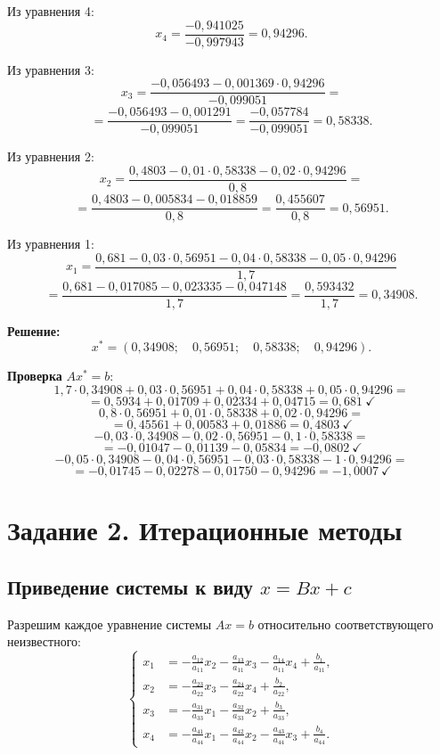\documentclass[a4paper, final]{article}
\begin{document}
Из уравнения 4:
\[
x_4 = \frac{-0{,}941025}{-0{,}997943} = 0{,}94296.
\]

Из уравнения 3:
\[
x_3 = \frac{-0{,}056493 - 0{,}001369 \cdot 0{,}94296}{-0{,}099051} = \]
     \[ = \frac{-0{,}056493 - 0{,}001291}{-0{,}099051}
     = \frac{-0{,}057784}{-0{,}099051} = 0{,}58338.
\]

Из уравнения 2:
\[
x_2 = \frac{0{,}4803 - 0{,}01 \cdot 0{,}58338 - 0{,}02 \cdot 0{,}94296}{0{,}8} = \]
     \[ = \frac{0{,}4803 - 0{,}005834 - 0{,}018859}{0{,}8}
     = \frac{0{,}455607}{0{,}8} = 0{,}56951.
\]

Из уравнения 1:
\[
x_1 = \frac{0{,}681 - 0{,}03 \cdot 0{,}56951 - 0{,}04 \cdot 0{,}58338 - 0{,}05 \cdot 0{,}94296}{1{,}7}
\]
\[
= \frac{0{,}681 - 0{,}017085 - 0{,}023335 - 0{,}047148}{1{,}7}
= \frac{0{,}593432}{1{,}7} = 0{,}34908.
\]

\textbf{Решение:}
\[
\boxed{x^* = (0{,}34908;\quad 0{,}56951;\quad 0{,}58338;\quad 0{,}94296).}
\]

\textbf{Проверка} $Ax^* = b$:
\[1{,}7 \cdot 0{,}34908 + 0{,}03 \cdot 0{,}56951 + 0{,}04 \cdot 0{,}58338 + 0{,}05 \cdot 0{,}94296 = \] \[= 0{,}5934 + 0{,}01709 + 0{,}02334 + 0{,}04715 = 0{,}681\ \checkmark\]
\[0{,}8 \cdot 0{,}56951 + 0{,}01 \cdot 0{,}58338 + 0{,}02 \cdot 0{,}94296
 = \] \[ = 0{,}45561 + 0{,}00583 + 0{,}01886 = 0{,}4803\ \checkmark\]
\[-0{,}03 \cdot 0{,}34908 - 0{,}02 \cdot 0{,}56951 - 0{,}1 \cdot 0{,}58338
= \] \[= -0{,}01047 - 0{,}01139 - 0{,}05834 = -0{,}0802\ \checkmark\]
\[-0{,}05 \cdot 0{,}34908 - 0{,}04 \cdot 0{,}56951 - 0{,}03 \cdot 0{,}58338 - 1 \cdot 0{,}94296
= \] \[= -0{,}01745 - 0{,}02278 - 0{,}01750 - 0{,}94296 = -1{,}0007\ \checkmark\]

\newpage

\section{Задание 2. Итерационные методы}

\subsection{Приведение системы к виду $x = Bx + c$}

Разрешим каждое уравнение системы $Ax = b$ относительно
соответствующего неизвестного:
\[
\left\{
\begin{aligned}
x_1 &= -\frac{a_{12}}{a_{11}}x_2 - \frac{a_{13}}{a_{11}}x_3 - \frac{a_{14}}{a_{11}}x_4
        + \frac{b_1}{a_{11}},\\
x_2 &= -\frac{a_{23}}{a_{22}}x_3 - \frac{a_{24}}{a_{22}}x_4 + \frac{b_2}{a_{22}},\\
x_3 &= -\frac{a_{31}}{a_{33}}x_1 - \frac{a_{32}}{a_{33}}x_2 + \frac{b_3}{a_{33}},\\
x_4 &= -\frac{a_{41}}{a_{44}}x_1 - \frac{a_{42}}{a_{44}}x_2
        - \frac{a_{43}}{a_{44}}x_3 + \frac{b_4}{a_{44}}.
\end{aligned}
\right.
\]
\end{document}
